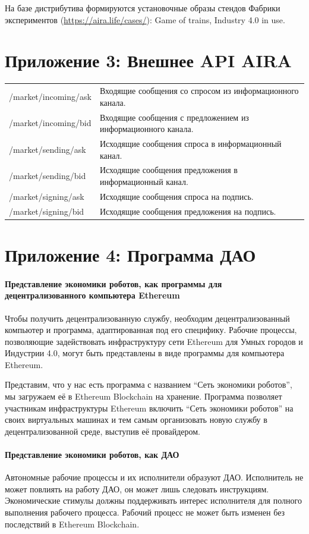\documentclass{article}
\begin{document}
На базе дистрибутива формируются установочные образы стендов Фабрики экспериментов (\url{https://aira.life/cases/}): Game of trains, Industry 4.0 in use.

\section*{Приложение 3: Внешнее API AIRA}

\begin{tabular}{ l |l}
	/market/incoming/ask & Входящие сообщения со спросом из информационного канала. \\
	/market/incoming/bid & Входящие сообщения с предложением из информационного канала. \\
	/market/sending/ask & Исходящие сообщения спроса в информационный канал. \\
	/market/sending/bid & Исходящие сообщения предложения в информационный канал. \\
	/market/signing/ask & Исходящие сообщения спроса на подпись. \\
	/market/signing/bid & Исходящие сообщения предложения на подпись. \\
\end{tabular}

\section*{Приложение 4: Программа ДАО}

\paragraph{Представление экономики роботов, как программы для децентрализованного компьютера Ethereum}

Чтобы получить децентрализованную службу, необходим децентрализованный компьютер и программа, адаптированная под его специфику. Рабочие процессы, позволяющие задействовать инфраструктуру сети Ethereum для Умных городов и Индустрии 4.0, могут быть представлены в виде программы для компьютера Ethereum. 

Представим, что у нас есть программа с названием “Сеть экономики роботов”, мы загружаем её в Ethereum Blockchain на хранение. Программа позволяет участникам инфраструктуры Ethereum включить  “Сеть экономики роботов” на своих виртуальных машинах и тем самым организовать новую службу в децентрализованной среде, выступив её провайдером.

\paragraph{Представление экономики роботов, как ДАО}

Автономные рабочие процессы и их исполнители образуют ДАО. Исполнитель не может повлиять на работу ДАО, он может лишь следовать инструкциям. Экономические стимулы должны поддерживать интерес исполнителя для полного выполнения рабочего процесса. Рабочий процесс не может быть изменен без последствий в Ethereum Blockchain.
\end{document}
